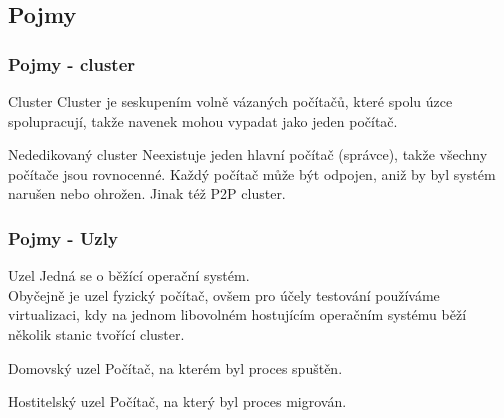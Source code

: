\documentclass{beamer}
\begin{document}
\subsection{Pojmy}
\begin {frame}
\frametitle {Pojmy - cluster}
	\begin {block} {Cluster}
		Cluster je seskupením volně vázaných počítačů, které spolu úzce spolupracují, takže navenek mohou vypadat jako jeden počítač.\cite{clanekClondike}
	\end {block}
	\begin {block} {Nededikovaný cluster}
		Neexistuje jeden hlavní počítač (správce), takže všechny počítače jsou rovnocenné. Každý počítač může být odpojen, aniž by byl systém narušen nebo ohrožen. Jinak též P2P cluster.\cite{clanekClondike}
	\end {block}
\end {frame}


\begin {frame}
\frametitle {Pojmy - Uzly}
	\begin {block} {Uzel}
		Jedná se o běžící operační systém.\\
		Obyčejně je uzel fyzický počítač, ovšem pro účely testování používáme virtualizaci, kdy na jednom libovolném hostujícím operačním systému běží několik stanic tvořící cluster. \cite{dpAndrejs}
	\end {block}
	\begin {block} {Domovský uzel}
		Počítač, na kterém byl proces spuštěn.
	\end {block}
	\begin {block} {Hostitelský uzel}
		Počítač, na který byl proces migrován.
	\end {block}
\end {frame}

\end{document}
